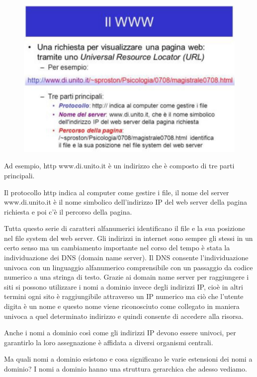 \begin{figure}[ht]
    \centering
    \includegraphics[width=0.9\linewidth]{images/03_lez_fig_07.jpg}
\end{figure}

Ad esempio, http www.di.unito.it è un indirizzo che è composto di tre parti principali.\par
Il protocollo http indica al computer come gestire i file, il nome del server www.di.unito.it è il nome simbolico dell'indirizzo IP del web server della pagina richiesta e poi c'è il percorso della pagina.\par
Tutta questo serie di caratteri alfanumerici identificano il file e la sua posizione nel file system del web server. Gli indirizzi in internet sono sempre gli stessi in un certo senso ma un cambiamento importante nel corso del tempo è stata la individuazione dei DNS (domain name server). Il DNS consente l'individuazione univoca con un linguaggio alfanumerico comprensibile con un passaggio da codice numerico a una stringa di testo. Grazie ai domain name server per raggiungere i siti si possono utilizzare i nomi a dominio invece degli indirizzi IP, cioè in altri termini ogni sito è raggiungibile attraverso un IP numerico ma ciò che l'utente digita è un nome e questo nome viene riconosciuto come collegato in maniera univoca a quel determinato indirizzo
e quindi consente di accedere alla risorsa.\par

Anche i nomi a dominio così come gli indirizzi IP devono essere univoci, per garantirlo la loro assegnazione è affidata a diversi organismi centrali.\par
Ma quali nomi a dominio esistono e cosa significano le varie estensioni dei nomi a dominio? I nomi a dominio hanno una struttura gerarchica che adesso vediamo.

